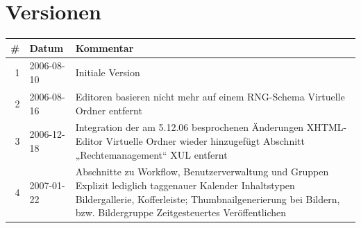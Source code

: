 \documentclass[titlepage,12pt,a4paper,halfparskip,ngerman]{scrreprt}
\title{\TheTitle}
\author{\TheAuthor}
\begin{document}
  \maketitle
  \tableofcontents
  \pagebreak
  \listoffigures
  \listoftables
  \pagebreak

 
  \chapter*{Versionen}

  \begin{longtable}{rlp{8cm}}
    \toprule
    \bf \# & \bf Datum & \bf Kommentar \\
    \midrule\endhead
    1 & 2006-08-10 & Initiale Version \\
    2 & 2006-08-16 & Editoren basieren nicht mehr auf einem RNG-Schema\newline
                     Virtuelle Ordner entfernt\\
    3 & 2006-12-18 & Integration der am 5.12.06 besprochenen Änderungen\newline
                     XHTML-Editor\newline
                     Virtuelle Ordner wieder hinzugefügt\newline
                     Abschnitt „Rechtemanagement“\newline
                     XUL entfernt
                     \\
    4 & 2007-01-22 & Abschnitte zu Workflow, Benutzerverwaltung und
                     Gruppen\newline
                     Explizit lediglich taggenauer Kalender\newline
                     Inhaltstypen Bildergallerie, Kofferleiste;
                     Thumbnailgenerierung bei Bildern, bzw.
                     Bildergruppe\newline
                     Zeitgesteuertes Veröffentlichen
                     \\
    \bottomrule
  \end{longtable}

  


    
    
    
    
    
    
    
    

    

    
    
\end{document}

